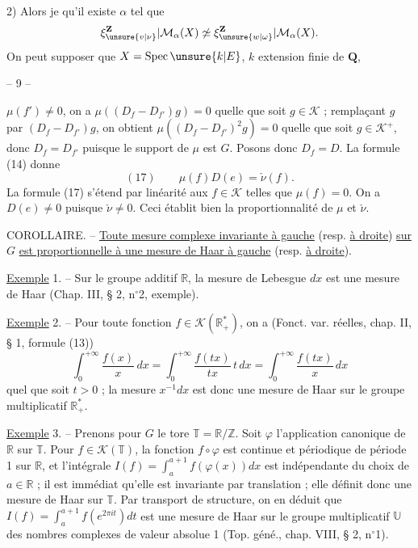 2) 
Alors je  qu’il existe $\alpha$ tel que
\[
 \xi_{\unsure{v|\nu}}^{\mathbf Z}|\mathcal M_\alpha(X)
 \not\simeq
 \xi_{\unsure{w|\omega}}^{\mathbf Z}|\mathcal M_\alpha(X).
\]
On peut supposer que $X=\operatorname{Spec}\unsure{k|E}$, $k$ extension finie de $\mathbf Q$,
\begin{center}-- 9 --\end{center}
$\mu(f')\ne0$, on a $\mu((D_f-D_{f'})g)=0$ quelle que soit $g\in\mathcal K$ ;
remplaçant $g$ par $(D_f-D_{f'})g$, on obtient
$\mu((D_f-D_{f'})^2g)=0$ quelle que soit $g\in\mathcal K^+$,
donc $D_f=D_{f'}$ puisque le support de $\mu$ est $G$.
Posons donc $D_f=D$. La formule (14) donne
\[
(17)\qquad \mu(f)D(e)=\check\nu(f).
\]
La formule (17) s’étend par linéarité aux $f\in\mathcal K$ telles que $\mu(f)=0$.
On a $D(e)\ne0$ puisque $\check\nu\ne0$.
Ceci établit bien la proportionnalité de $\mu$ et $\check\nu$.

COROLLAIRE. -- \uline{Toute mesure complexe invariante à gauche}
(resp. \uline{à droite}) \uline{sur} $G$
\uline{est proportionnelle à une mesure de Haar à gauche}
(resp. \uline{à droite}).

\uline{Exemple} 1. -- Sur le groupe additif $\mathbb R$, la mesure de Lebesgue $dx$
est une mesure de Haar (Chap. III, § 2, n$^\circ$2, exemple).

\uline{Exemple} 2. -- Pour toute fonction $f\in\mathcal K(\mathbb R_+^*)$,
on a (Fonct. var. réelles, chap. II, § 1, formule (13))
\[
\int_0^{+\infty}\frac{f(x)}x\,dx
=\int_0^{+\infty}\frac{f(tx)}{tx}\,t\,dx
=\int_0^{+\infty}\frac{f(tx)}x\,dx
\]
quel que soit $t>0$ ; la mesure $x^{-1}dx$ est donc une mesure de Haar
sur le groupe multiplicatif $\mathbb R_+^*$.

\uline{Exemple} 3. -- Prenons pour $G$ le tore $\mathbb T=\mathbb R/\mathbb Z$.
Soit $\varphi$ l’application canonique de $\mathbb R$ sur $\mathbb T$.
Pour $f\in\mathcal K(\mathbb T)$, la fonction $f\circ\varphi$ est continue et
périodique de période 1 sur $\mathbb R$, et l’intégrale
$I(f)=\int_a^{a+1}f(\varphi(x))dx$ est indépendante du choix de $a\in\mathbb R$ ;
il est immédiat qu’elle est invariante par translation ; elle définit donc
une mesure de Haar sur $\mathbb T$. Par transport de structure, on en déduit que
$I(f)=\int_a^{a+1}f(e^{2\pi it})dt$ est une mesure de Haar sur le groupe
multiplicatif $\mathbb U$ des nombres complexes de valeur absolue 1
(Top. géné., chap. VIII, § 2, n$^\circ$1).

